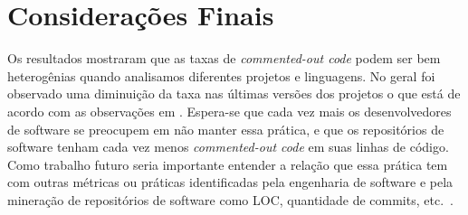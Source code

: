 \documentclass[12pt]{article}
\begin{document}
\section{Considerações Finais}

Os resultados mostraram que as taxas de \textit{commented-out code} podem ser bem
heterogênias quando analisamos diferentes projetos e linguagens. No geral foi observado
uma diminuição da taxa nas últimas versões dos projetos o que está de acordo com 
as observações em \cite{articleMiningComments}. Espera-se que cada vez mais os desenvolvedores
de software se preocupem em não manter essa prática, e que os repositórios de software
tenham cada vez menos \textit{commented-out code} em suas linhas de código. Como trabalho
futuro seria importante entender a relação que essa prática tem com outras métricas ou 
práticas identificadas pela engenharia de software e pela mineração de repositórios de
software como LOC, quantidade de commits, etc.~\cite{crimeScene}.



\end{document}
